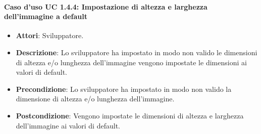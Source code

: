 \paragraph{Caso d'uso UC 1.4.4: Impostazione di altezza e larghezza dell'immagine a default}

\FloatBarrier
\begin{itemize}
\item\textbf{Attori}: Sviluppatore.
\item\textbf{Descrizione}: Lo sviluppatore ha impostato in modo non valido le dimensioni di altezza e/o lunghezza dell'immagine vengono impostate le dimensioni ai valori di default.
\item\textbf{Precondizione}: Lo sviluppatore ha impostato in modo non valido la dimensione di altezza e/o lunghezza dell'immagine.
\item\textbf{Postcondizione}: Vengono impostate le dimensioni di altezza e larghezza dell'immagine ai valori di default.
\end{itemize}


